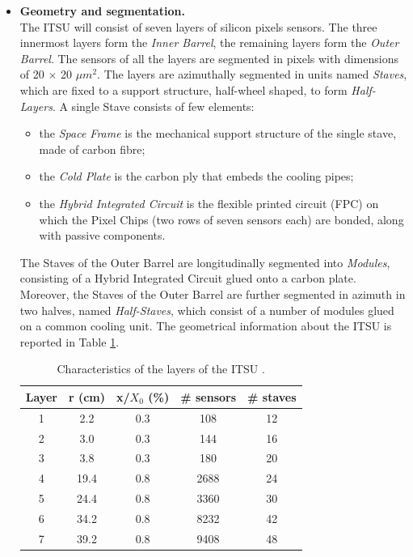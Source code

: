 \begin{itemize}
 \item \textbf{Geometry and segmentation.}\\
 The ITSU will consist of seven layers of silicon pixels sensors. The three innermost layers form the \textit{Inner Barrel}, the remaining layers form the \textit{Outer Barrel}. The sensors of all the layers are segmented in pixels with dimensions of 20 $\times$ 20 $\mu m^2$. The layers are azimuthally segmented in units named \textit{Staves}, which are fixed to a support structure, half-wheel shaped, to form \textit{Half-Layers}. A single Stave consists of few elements:
 \begin{itemize}
  \item the \textit{Space Frame} is the mechanical support structure of the single stave, made of carbon fibre;
  \item the \textit{Cold Plate} is the carbon ply that embeds the cooling pipes;
  \item the \textit{Hybrid Integrated Circuit} is the flexible printed circuit (FPC) on which the Pixel Chips (two rows of seven sensors each) are bonded, along with passive components.
 \end{itemize}
 The Staves of the Outer Barrel are longitudinally segmented into \textit{Modules}, consisting of a Hybrid Integrated Circuit glued onto a carbon plate. Moreover, the Staves of the Outer Barrel are further segmented in azimuth in two halves, named \textit{Half-Staves}, which consist of a number of modules glued on a common cooling unit. The geometrical information about the ITSU is reported in Table \ref{tab:itsu}. 
\begin{table}
\centering
\renewcommand\arraystretch{1.5}
 \begin{tabular}{|c|c|c|c|c|}
  \hline
  Layer & r (cm) & x/$X_0$ (\%) & \# sensors & \# staves\\
  \hline
  1 & 2.2 & 0.3 & 108 & 12\\
  2 & 3.0 & 0.3 & 144 & 16\\
  3 & 3.8 & 0.3 & 180 & 20\\
  4 & 19.4 & 0.8 & 2688 & 24\\
  5 & 24.4 & 0.8 & 3360 & 30\\
  6 & 34.2 & 0.8 & 8232 & 42\\
  7 & 39.2 & 0.8 & 9408 & 48\\
  \hline
 \end{tabular}
 \caption{Characteristics of the layers of the ITSU \cite{uptdr}.}
 \label{tab:itsu}
\end{table}

\end{itemize}
